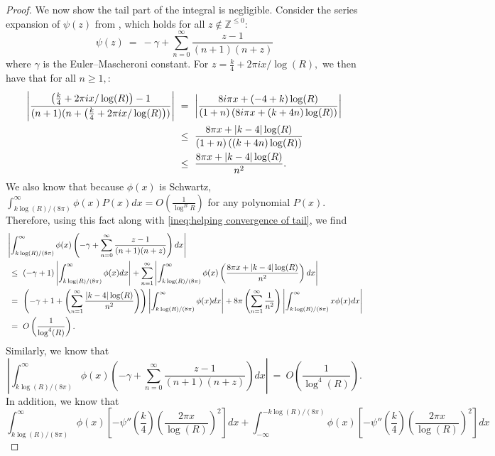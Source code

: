 \documentclass[10pt,a4paper]{amsart}
\newcommand{\Z}{\mathbb{Z}}
\begin{document}
\begin{proof}
We now show the tail part of the integral is negligible. Consider the series expansion of $\psi(z)$ from \cite{abramowitz1972handbook}, which holds for all $z \notin \Z^{\leq 0}$:
\begin{equation}
\psi(z) \ = \ -\gamma + \sum_{n=0}^\infty \frac{z-1}{(n+1)(n+z)}
\end{equation}
where $\gamma$ is the Euler–Mascheroni constant. For $z = \frac{k}{4}+2\pi i x/ \log(R),$ we then have that for all $n \geq 1,$:
\begin{align}\label{ineq:helping convergence of tail}
  \left|  \frac{\left(\frac{k}{4}+2\pi i x/ \log(R)\right)-1}{(n+1)(n+\left(\frac{k}{4}+2\pi i x/ \log(R)\right))}\right| & \ = \ \left|\frac{8 i \pi x + (-4 + k) \log(R)}{(1 + n)\left(8 i \pi x + (k + 4n) \log(R)\right)}\right| \notag \\
  & \ \leq \ \frac{8\pi x + |k-4| \log(R)}{(1 + n)\left((k + 4n) \log(R)\right)} \notag \\
  & \ \leq \ \frac{8\pi x+|k-4|\log(R)}{n^2}.
\end{align} 
We also know that because $\phi(x)$ is Schwartz, $\int_{k\log(R)/(8\pi)}^\infty \phi(x) P(x)dx = O\left(\frac{1}{\log^B R}\right)$ for any polynomial $P(x)$. 
Therefore, using this fact along with \eqref{ineq:helping convergence of tail}, we find 
\begin{align}\label{eq: remainder part 1/R} &\left|\int_{k\log(R)/(8\pi)}^\infty  \phi(x)\left(-\gamma + \sum_{n=0}^\infty \frac{z-1}{(n+1)(n+z)}\right) dx \right|\notag\\
   & \ \leq \ (-\gamma +1)\left|\int_{k\log(R)/(8\pi)}^\infty  \phi(x)dx \right|+  \sum_{n=1}^\infty\left|\int_{k\log(R)/(8\pi)}^\infty\phi(x)\left(\frac{8\pi x+|k-4|\log(R)}{n^2}\right)dx \right| \notag\\
   & \ = \ \left(-\gamma +1+ \left(\sum_{n=1}^\infty \frac{|k-4|\log(R)}{n^2}\right)\right)\left|\int_{k\log(R)/(8\pi)}^\infty  \phi(x)dx\right| +  8\pi \left(\sum_{n=1}^\infty \frac{1}{n^2}\right)\left|\int_{k\log(R)/(8\pi)}^\infty  x\phi(x)dx\right|
   \notag \\
   & \ = \ O\left(\frac{1}{\log^4(R)}\right).
\end{align} Similarly, we know that $$\left|\int_{k\log(R)/(8\pi)}^\infty  \phi(x)\left(-\gamma + \sum_{n=0}^\infty \frac{z-1}{(n+1)(n+z)}\right) dx \right| \ = \ O\left(\frac{1}{\log^4(R)}\right).$$ 
In addition, we know that \begin{equation} \label{eq: other piece of remainder}
    \int_{k\log(R)/(8\pi)}^{\infty} \phi(x)\left[-\psi''\left(\frac{k}{4}\right)\left(\frac{2\pi x}{\log(R)}\right)^2\right]dx + \int_{-\infty}^{-k\log(R)/(8\pi)} \phi(x)\left[-\psi''\left(\frac{k}{4}\right)\left(\frac{2\pi x}{\log(R)}\right)^2\right]dx

\end{equation}
\end{proof}
\end{document}
